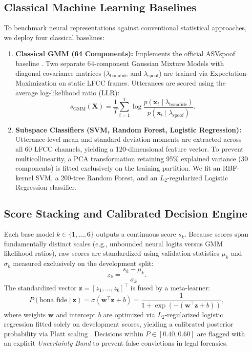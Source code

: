 \documentclass[conference]{IEEEtran}
\begin{document}
\subsection{Classical Machine Learning Baselines}
To benchmark neural representations against conventional statistical approaches, we deploy four classical baselines:
\begin{enumerate}
    \item \textbf{Classical GMM (64 Components):} Implements the official ASVspoof baseline \cite{todisco2019asvspoof}. Two separate 64-component Gaussian Mixture Models with diagonal covariance matrices ($\lambda_{\text{bonafide}}$ and $\lambda_{\text{spoof}}$) are trained via Expectation-Maximization on static LFCC frames. Utterances are scored using the average log-likelihood ratio (LLR):
    \begin{equation}
    s_{\text{GMM}}(\mathbf{X}) = \frac{1}{T}\sum_{t=1}^T \log\frac{p(\mathbf{x}_t \mid \lambda_{\text{bonafide}})}{p(\mathbf{x}_t \mid \lambda_{\text{spoof}})}.
    \end{equation}
    \item \textbf{Subspace Classifiers (SVM, Random Forest, Logistic Regression):} Utterance-level mean and standard deviation moments are extracted across all 60 LFCC channels, yielding a 120-dimensional feature vector. To prevent multicollinearity, a PCA transformation retaining 95\% explained variance (30 components) is fitted exclusively on the training partition. We fit an RBF-kernel SVM, a 200-tree Random Forest, and an $L_2$-regularized Logistic Regression classifier.
\end{enumerate}

\subsection{Score Stacking and Calibrated Decision Engine}
Each base model $k \in \{1,\dots,6\}$ outputs a continuous score $s_k$. Because scores span fundamentally distinct scales (e.g., unbounded neural logits versus GMM likelihood ratios), raw scores are standardized using validation statistics $\mu_k$ and $\sigma_k$ measured exclusively on the development split:
\begin{equation}
z_k = \frac{s_k - \mu_k}{\sigma_k}.
\end{equation}
The standardized vector $\mathbf{z} = [z_1, \dots, z_6]^{\top}$ is fused by a meta-learner:
\begin{equation}
P(\text{bona fide} \mid \mathbf{z}) = \sigma(\mathbf{w}^{\top}\mathbf{z} + b) = \frac{1}{1 + \exp(-(\mathbf{w}^{\top}\mathbf{z} + b))},
\end{equation}
where weights $\mathbf{w}$ and intercept $b$ are optimized via $L_2$-regularized logistic regression fitted solely on development scores, yielding a calibrated posterior probability via Platt scaling \cite{platt1999probabilistic}. Decisions within $P \in [0.40, 0.60]$ are flagged with an explicit \textit{Uncertainty Band} to prevent false convictions in legal forensics.
\end{document}
